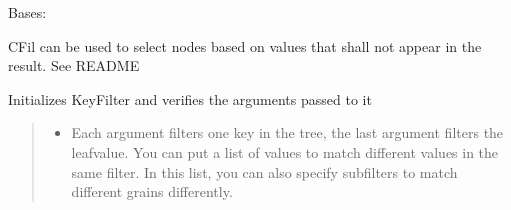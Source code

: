 \documentclass[a4paper,10pt,english]{sphinxmanual}
\begin{document}
\begin{fulllineitems}
\label{\detokenize{fagus:fagus.CFil}}
\pysigstartsignatures
{}
\pysigstopsignatures
\sphinxAtStartPar
Bases: {\hyperref[\detokenize{fagus.filters:fagus.filters.KFil}]{}}

\sphinxAtStartPar
CFil \sphinxhyphen{} can be used to select nodes based on values that shall not appear in the result. See README

\begin{fulllineitems}
\label{\detokenize{fagus:fagus.CFil.__init__}}
\pysigstartsignatures
{}
\pysigstopsignatures
\sphinxAtStartPar
Initializes KeyFilter and verifies the arguments passed to it
\begin{quote}\begin{description}
\begin{itemize}
\item {}
\sphinxAtStartPar
{} \textendash{} Each argument filters one key in the tree, the last argument filters the leaf\sphinxhyphen{}value. You can
put a list of values to match different values in the same filter. In this list, you can also specify
subfilters to match different grains differently.


\end{itemize}
\end{description}
\end{quote}
\end{fulllineitems}
\end{fulllineitems}
\end{document}
